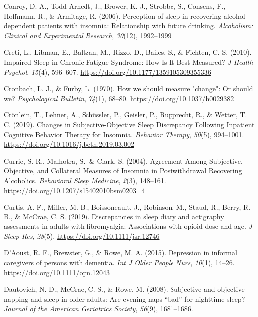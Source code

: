 \documentclass[
]{article}
\newlength{\cslhangindent}
\newenvironment{CSLReferences}[2] %
 {\begin{list}{}{%
  \setlength{\itemindent}{0pt}
  \setlength{\leftmargin}{0pt}
  \setlength{\parsep}{0pt}
  \ifodd #1
   \setlength{\leftmargin}{\cslhangindent}
   \setlength{\itemindent}{-1\cslhangindent}
  \fi
  \setlength{\itemsep}{#2\baselineskip}}}
 {\end{list}}
\begin{document}
\begin{CSLReferences}{1}{0}
Conroy, D. A., Todd Arnedt, J., Brower, K. J., Strobbe, S., Consens, F., Hoffmann, R., \& Armitage, R. (2006). Perception of sleep in recovering alcohol-dependent patients with insomnia: Relationship with future drinking. \emph{Alcoholism: Clinical and Experimental Research}, \emph{30}(12), 1992--1999.

Creti, L., Libman, E., Baltzan, M., Rizzo, D., Bailes, S., \& Fichten, C. S. (2010). Impaired {Sleep} in {Chronic} {Fatigue} {Syndrome}: {How} {Is} {It} {Best} {Measured}? \emph{J Health Psychol}, \emph{15}(4), 596--607. \url{https://doi.org/10.1177/1359105309355336}

Cronbach, L. J., \& Furby, L. (1970). {How we should measure "change": Or should we?} \emph{Psychological Bulletin}, \emph{74}(1), 68--80. \url{https://doi.org/10.1037/h0029382}

Crönlein, T., Lehner, A., Schüssler, P., Geisler, P., Rupprecht, R., \& Wetter, T. C. (2019). Changes in {Subjective}-{Objective} {Sleep} {Discrepancy} {Following} {Inpatient} {Cognitive} {Behavior} {Therapy} for {Insomnia}. \emph{Behavior Therapy}, \emph{50}(5), 994--1001. \url{https://doi.org/10.1016/j.beth.2019.03.002}

Currie, S. R., Malhotra, S., \& Clark, S. (2004). Agreement {Among} {Subjective}, {Objective}, and {Collateral} {Measures} of {Insomnia} in {Postwithdrawal} {Recovering} {Alcoholics}. \emph{Behavioral Sleep Medicine}, \emph{2}(3), 148--161. \url{https://doi.org/10.1207/s15402010bsm0203_4}

Curtis, A. F., Miller, M. B., Boissoneault, J., Robinson, M., Staud, R., Berry, R. B., \& McCrae, C. S. (2019). Discrepancies in sleep diary and actigraphy assessments in adults with fibromyalgia: {Associations} with opioid dose and age. \emph{J Sleep Res}, \emph{28}(5). \url{https://doi.org/10.1111/jsr.12746}

D'Aoust, R. F., Brewster, G., \& Rowe, M. A. (2015). Depression in informal caregivers of persons with dementia. \emph{Int J Older People Nurs}, \emph{10}(1), 14--26. \url{https://doi.org/10.1111/opn.12043}

Dautovich, N. D., McCrae, C. S., \& Rowe, M. (2008). Subjective and objective napping and sleep in older adults: Are evening naps {``bad''} for nighttime sleep? \emph{Journal of the American Geriatrics Society}, \emph{56}(9), 1681--1686.


\end{CSLReferences}
\end{document}
